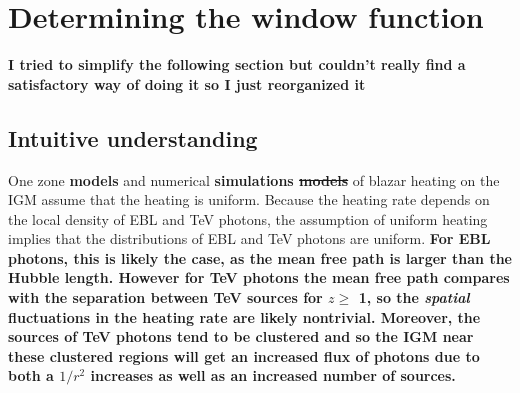 \documentclass[twocolumns]{emulateapj}
\newcommand\ALc[1]{{\color{red} \bf #1}} %
\begin{document}











\section {Determining the window function}\label{window}
\ALc{I tried to simplify the following section but couldn't really find a satisfactory way of doing it so I just reorganized it}
\ALc{\subsection{Intuitive understanding}}

One zone \ALc{models} \citep{2012ApJ...752...23C,2012ApJ...752...24P} and numerical \ALc{simulations \sout{models}} \citep{2012MNRAS.423..149P} of blazar heating on the IGM assume that the heating is uniform.  Because the heating rate depends on the local density of EBL and TeV photons, the assumption of uniform heating implies that the distributions of EBL and TeV photons are uniform.  \ALc{For EBL photons, this is likely the case, as the mean free path is larger than the Hubble length. However for TeV photons the mean free path compares with the separation between TeV sources for $z\geqslant$ 1, so the {\it spatial} fluctuations in the heating rate are likely nontrivial. Moreover, the sources of TeV photons tend to be clustered and so the IGM near these clustered regions will get an increased flux of photons due to both a $1/r^2$ increases as well as an increased number of sources.}  
\end{document}

